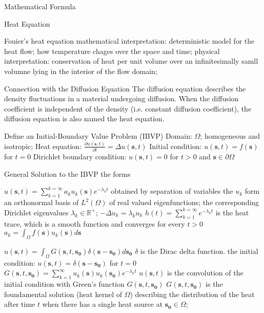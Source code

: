 \documentclass{article}
\begin{document}
\begin{outline}[enumerate]



  \1 Mathematical Formula

     \2 Heat Equation %

        \3 Fouier's heat equation
         \4 mathematical interpretation: deterministic model for the heat flow; how temperature chages over the space and time;
         \4 physical interpretation: conservation of heat per unit volume over an infinitesimally samll volumne lying in the interior of the flow domain;
         
        \3 Connection with the Diffusion Equation
          \4 The diffusion equation describes the density fluctuations in a material undergoing diffusion.
          \4 When the diffusion coefficient is independent of the density (i.e. constant diffusion coefficient), the diffusion equation is also named the heat equation.
   
        \3 Define an Initial-Boundary Value Problem (IBVP)
          \4 Domain: $\Omega$; homogeneous and isotropic; 
          \4 Heat equation: $\frac{\partial u(\bm{s}, t)}{\partial t} = \Delta u(\bm{s}, t)$
          \4 Initial condition: $u(\bm{s}, t) = f(\bm{s})$ for $t=0$
          \4 Dirichlet boundary condition: $u(\bm{s}, t) = 0$ for $t>0$ and $\bm{s} \in \partial \Omega$

     \2 General Solution to the IBVP
       \3 the forms
          

       \3 $u(\bm{s}, t) = \sum_{k=1}^{k=\infty} a_ku_k(\bm{s})e^{-\lambda_kt}$ %
          \4 obtained by separation of variables
          \4 the $u_k$ form an orthonormal basis of $L^2(\Omega)$ of real valued eigenfunctions; the corresponding Dirichlet eigenvalues $\lambda_k \in \mathbb{R^{+}}$; $-\Delta u_k = \lambda_k u_k$
          \4 $h(t) = \sum_{k=1}^{k=\infty} e^{-\lambda_kt}$ is the heat trace, which is a smooth function and converges for every $t>0$  %
          \4 $a_k = \int_{\Omega} f(\bm{s})u_k(\bm{s}) d\bm{s}$

       \3 $u(\bm{s}, t) = \int_{\Omega} G(\bm{s}, t, \bm{s_0})  \delta(\bm{s} - \bm{s_0}) d\bm{s_0}$
          \4 $\delta$ is the Dirac delta function.
          \4 the initial condition: $u(\bm{s}, t) = \delta(\bm{s} - \bm{s_0})$ for $t=0$
          \4 $G(\bm{s}, t, \bm{s_0}) = \sum_{k=1}^{\infty} u_k(\bm{s})u_k(\bm{s_0})e^{-\lambda_kt}$
          \4 $u(\bm{s}, t)$ is the convolution of the initial condition with Green's function $G(\bm{s}, t, \bm{s_0})$
          \4 $G(\bm{s}, t, \bm{s_0})$ is the foundamental solution (heat kernel of $\Omega$) describing the distribution of the heat after time $t$ when there has a single heat source at $\bm{s_0} \in \Omega$; 


\end{outline}
\end{document}
